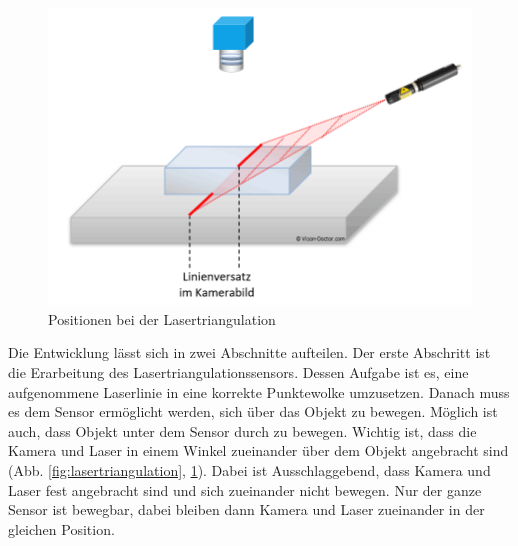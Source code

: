 	\newpage
	
	\begin{figure}[h]
		\centering
		\includegraphics[width=0.6\linewidth]{img/grundlagen/lasertriangulation_2}
		\caption{Positionen bei der Lasertriangulation}
		\label{fig:lasertriangulation_position}
	\end{figure}
	
	Die Entwicklung lässt sich in zwei Abschnitte aufteilen. Der erste Abschritt ist die Erarbeitung des Lasertriangulationssensors. Dessen Aufgabe ist es, eine aufgenommene Laserlinie in eine korrekte Punktewolke umzusetzen. Danach muss es dem Sensor ermöglicht werden, sich über das Objekt zu bewegen. Möglich ist auch, dass Objekt unter dem Sensor durch zu bewegen. \newline
	Wichtig ist, dass die Kamera und Laser in einem Winkel zueinander über dem Objekt angebracht sind (Abb. \ref{fig:lasertriangulation}, \ref{fig:lasertriangulation_position}). Dabei ist Ausschlaggebend, dass Kamera und Laser fest angebracht sind und sich zueinander nicht bewegen. Nur der ganze Sensor ist bewegbar, dabei bleiben dann Kamera und Laser zueinander in der gleichen Position.
	\label{chap:grundlegender_aufbau}
	
